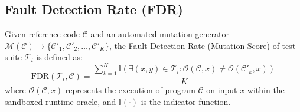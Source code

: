 \documentclass[conference]{IEEEtran}
\begin{document}
\subsection{Fault Detection Rate (FDR)}
Given reference code $\mathcal{C}$ and an automated mutation generator $\mathcal{M}(\mathcal{C}) \to \{\mathcal{C}'_1, \mathcal{C}'_2, \dots, \mathcal{C}'_K\}$, the Fault Detection Rate (Mutation Score) of test suite $\mathcal{T}_i$ is defined as:
\begin{equation}
    \text{FDR}(\mathcal{T}_i, \mathcal{C}) = \frac{\sum_{k=1}^{K} \mathbb{I}\left( \exists (x, y) \in \mathcal{T}_i : \mathcal{O}(\mathcal{C}, x) \neq \mathcal{O}(\mathcal{C}'_k, x) \right)}{K}
\end{equation}
where $\mathcal{O}(\mathcal{C}, x)$ represents the execution of program $\mathcal{C}$ on input $x$ within the sandboxed runtime oracle, and $\mathbb{I}(\cdot)$ is the indicator function.
\end{document}
